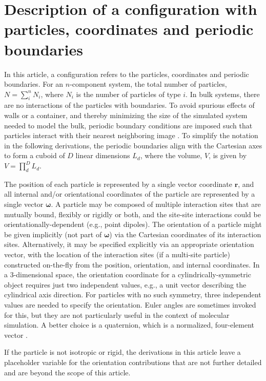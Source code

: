 \section{\label{sec:configuration}Description of a configuration with particles, coordinates and periodic boundaries}

In this article, a configuration refers to the particles, coordinates and periodic boundaries.
For an $n$-component system, the total number of particles, $N=\sum_{i}^{n} N_i$, where $N_i$ is the number of particles of type $i$.
In bulk systems, there are no interactions of the particles with boundaries.
To avoid spurious effects of walls or a container, and thereby minimizing the size of the simulated system needed to model the bulk, periodic boundary conditions are imposed such that particles interact with their nearest neighboring image \cite{allen_computer_1989}.
To simplify the notation in the following derivations, the periodic boundaries align with the Cartesian axes to form a cuboid of $D$ linear dimensions $L_d$, where the volume, $V$, is given by $V=\prod_d^D L_d$.

The position of each particle is represented by a single vector coordinate $\mathbf{r}$, and all internal and/or orientational coordinates of the particle are represented by a single vector $\boldsymbol{\omega}$.
A particle may be composed of multiple interaction sites that are mutually bound, flexibly or rigidly or both, and the site-site interactions could be orientationally-dependent (e.g., point dipoles).
The orientation of a particle might be given implicitly (not part of $\boldsymbol{\omega}$) via the Cartesian coordinates of its interaction sites.
Alternatively, it may be specified explicitly via an appropriate orientation vector, with the location of the interaction sites (if a multi-site particle) constructed on-the-fly from the position, orientation, and internal coordinates.
In a 3-dimensional space, the orientation coordinate for a cylindrically-symmetric object requires just two independent values, e.g., a unit  vector describing the cylindrical axis direction.
For particles with no such symmetry, three independent values are needed to specify the orientation.
Euler angles are sometimes invoked for this, but they are not particularly useful in the context of molecular simulation.
A better choice is a quaternion, which is a normalized, four-element vector \cite{vesely_angular_1982, karney_quaternions_2007}.

If the particle is not isotropic or rigid, the derivations in this article leave a placeholder variable for the orientation contributions that are not further detailed and are beyond the scope of this article.
